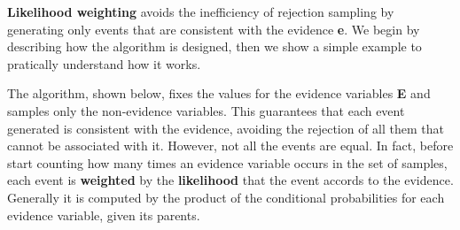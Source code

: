 \textbf{Likelihood weighting} avoids the inefficiency of rejection sampling by generating only events that are consistent with the evidence \textbf{e}. We begin by describing
how the algorithm is designed, then we show a simple example to pratically understand how it works. \vspace{3.5pt}

The algorithm, shown below, fixes the values for the evidence variables \textbf{E} and samples only the non-evidence variables. This guarantees that each event generated 
is consistent with the evidence, avoiding the rejection of all them that cannot be associated with it. However, not all the events are equal. In fact, before start counting
how many times an evidence variable occurs in the set of samples, each event is \textbf{weighted} by the \textbf{likelihood} that the event accords to the evidence.
Generally it is computed by the product of the conditional probabilities for each evidence variable, given its parents.
